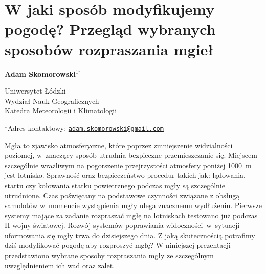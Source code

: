 \documentclass[\main/boa.tex]{subfiles}
\begin{document}
\sloppy


\section{W jaki sposób modyfikujemy pogodę? Przegląd wybranych sposobów rozpraszania mgieł}

\begin{center}
  {\bf {} Adam Skomorowski$^{1^\star}$}
\end{center}

\vskip 0.3cm

\begin{affiliations}
\begin{enumerate}
\begin{minipage}{0.915\textwidth}
\centering
\item Uniwersytet Łódzki \\ Wydział Nauk Geograficznych \\ Katedra Meteorologii i Klimatologii\\[-2pt]
\end{minipage}
\end{enumerate}
$^\star$Adres kontaktowy: \href{mailto:adam.skomorowski@gmail.com}{\nolinkurl{adam.skomorowski@gmail.com}}\\
\end{affiliations}

\vskip 0.5cm


\vskip 0.5cm
\begin{sloppypar}
Mgła to zjawisko atmosferyczne, które poprzez zmniejszenie widzialności poziomej, w znaczący sposób utrudnia bezpieczne przemieszczanie się. Miejscem szczególnie wrażliwym na pogorszenie przejrzystości atmosfery poniżej 1000~m jest lotnisko. Sprawność oraz bezpieczeństwo procedur takich jak: lądowania, startu czy kołowania statku powietrznego podczas mgły są szczególnie utrudnione. Czas poświęcany na podstawowe czynności związane z obsługą samolotów w momencie wystąpienia mgły ulega znacznemu wydłużeniu. Pierwsze systemy mające za zadanie rozpraszać mgłę na lotniskach testowano już podczas II wojny światowej. Rozwój systemów poprawiania widoczności~w~sytuacji uformowania się mgły trwa do dzisiejszego dnia. Z jaką skutecznością potrafimy dziś modyfikować pogodę aby rozproszyć mgłę? W niniejszej prezentacji przedstawiono wybrane sposoby rozpraszania mgły ze szczególnym uwzględnieniem ich wad oraz zalet.
\end{sloppypar}
\end{document}
